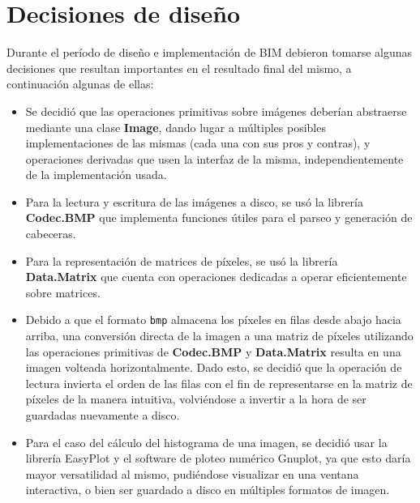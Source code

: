 \documentclass[a4paper, 11pt]{article} %
\begin{document}

\section*{Decisiones de diseño}

Durante el período de diseño e implementación de BIM debieron tomarse algunas decisiones que resultan importantes en el resultado final del mismo, a continuación algunas de ellas:
	
	\begin{itemize}
		\item Se decidió que las operaciones primitivas sobre imágenes deberían abstraerse mediante una clase \textbf{Image}, dando lugar a múltiples posibles implementaciones de las mismas (cada una con sus pros y contras), y operaciones derivadas que usen la interfaz de la misma, independientemente de la implementación usada.
		
		\item Para la lectura y escritura de las imágenes a disco, se usó la librería \textbf{Codec.BMP} que implementa funciones útiles para el parseo y generación de cabeceras.
		
		\item Para la representación de matrices de píxeles, se usó la librería \\ \textbf{Data.Matrix} que cuenta con operaciones dedicadas a operar eficientemente sobre matrices.
	
		\item Debido a que el formato \texttt{bmp} almacena los píxeles en filas desde abajo hacia arriba, una conversión directa de la imagen a una matriz de píxeles utilizando las operaciones primitivas de \textbf{Codec.BMP} y \textbf{Data.Matrix} resulta en una imagen volteada horizontalmente. Dado esto, se decidió que la operación de lectura invierta el orden de las filas con el fin de representarse en la matriz de píxeles de la manera intuitiva, volviéndose a invertir a la hora de ser guardadas nuevamente a disco.	
		
		\item Para el caso del cálculo del histograma de una imagen, se decidió usar la librería EasyPlot y el software de ploteo numérico Gnuplot, ya que esto daría mayor versatilidad al mismo, pudiéndose visualizar en una ventana interactiva, o bien ser guardado a disco en múltiples formatos de imagen.


\end{itemize}
\end{document}
